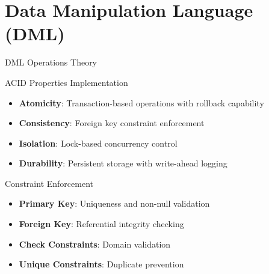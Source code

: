 \documentclass[aspectratio=169]{beamer}
\begin{document}
\section{Data Manipulation Language (DML)}

\begin{frame}{DML Operations Theory}
\begin{block}{ACID Properties Implementation}
\begin{itemize}
    \item \textbf{Atomicity}: Transaction-based operations with rollback capability
    \item \textbf{Consistency}: Foreign key constraint enforcement
    \item \textbf{Isolation}: Lock-based concurrency control
    \item \textbf{Durability}: Persistent storage with write-ahead logging
\end{itemize}
\end{block}

\begin{block}{Constraint Enforcement}
\begin{itemize}
    \item \textbf{Primary Key}: Uniqueness and non-null validation
    \item \textbf{Foreign Key}: Referential integrity checking
    \item \textbf{Check Constraints}: Domain validation
    \item \textbf{Unique Constraints}: Duplicate prevention
\end{itemize}
\end{block}
\end{frame}
\end{document}
